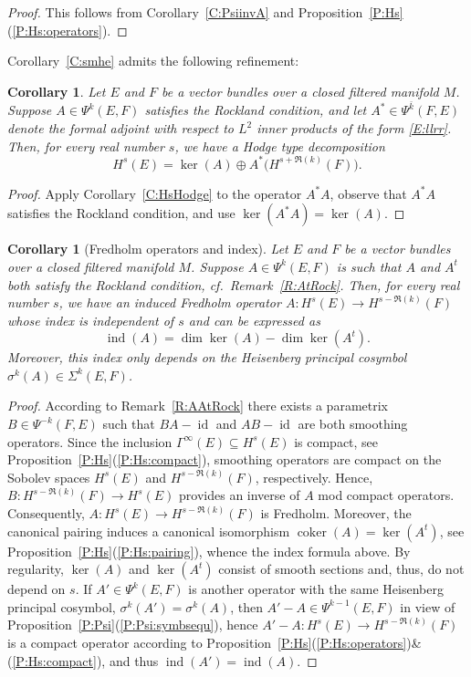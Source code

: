 \documentclass[reqno,12pt]{amsart}
\DeclareMathOperator{\coker}{coker}
\DeclareMathOperator{\ind}{ind}
\DeclareMathOperator{\id}{id}
\newcommand\itemref[1]{(\ref{#1})}
\theoremstyle{plain}
\newtheorem{corollary}[theorem]{Corollary}
\theoremstyle{definition}
\begin{document}
\begin{proof}
This follows from Corollary~\ref{C:PsiinvA} and Proposition~\ref{P:Hs}\itemref{P:Hs:operators}.
\end{proof}


Corollary~\ref{C:smhe} admits the following refinement:


\begin{corollary}\label{C:he}
Let $E$ and $F$ be a vector bundles over a closed filtered manifold $M$.
Suppose $A\in\Psi^k(E,F)$ satisfies the Rockland condition, and let $A^*\in\Psi^{\bar k}(F,E)$ denote the formal adjoint with respect to $L^2$ inner products of the form \eqref{E:llrr}.
Then, for every real number $s$, we have a Hodge type decomposition
$$
H^s(E)=\ker(A)\oplus A^*\bigl(H^{s+\Re(k)}(F)\bigr).
$$
\end{corollary}


\begin{proof}
Apply Corollary~\ref{C:HsHodge} to the operator $A^*A$, observe that $A^*A$ satisfies the Rockland condition, and use $\ker(A^*A)=\ker(A)$.
\end{proof}


\begin{corollary}[Fredholm operators and index]\label{C:Fredholm}
Let $E$ and $F$ be a vector bundles over a closed filtered manifold $M$.
Suppose $A\in\Psi^k(E,F)$ is such that $A$ and $A^t$ both satisfy the Rockland condition, cf.\ Remark~\ref{R:AtRock}.
Then, for every real number $s$, we have an induced Fredholm operator $A\colon H^s(E)\to H^{s-\Re(k)}(F)$ whose index is independent of $s$ and can be expressed as
$$
\ind(A)=\dim\ker(A)-\dim\ker(A^t).
$$
Moreover, this index only depends on the Heisenberg principal cosymbol $\sigma^k(A)\in\Sigma^k(E,F)$.
\end{corollary}


\begin{proof}
According to Remark~\ref{R:AAtRock} there exists a parametrix $B\in\Psi^{-k}(F,E)$ such that $BA-\id$ and $AB-\id$ are both smoothing operators.
Since the inclusion $\Gamma^\infty(E)\subseteq H^s(E)$ is compact, see Proposition~\ref{P:Hs}\itemref{P:Hs:compact}, smoothing operators are compact on the Sobolev spaces $H^s(E)$ and $H^{s-\Re(k)}(F)$, respectively.
Hence, $B\colon H^{s-\Re(k)}(F)\to H^s(E)$ provides an inverse of $A$ mod compact operators.
Consequently, $A\colon  H^s(E)\to H^{s-\Re(k)}(F)$ is Fredholm.
Moreover, the canonical pairing induces a canonical isomorphism $\coker(A)=\ker(A^t)$, see Proposition~\ref{P:Hs}\itemref{P:Hs:pairing}, whence the index formula above.
By regularity, $\ker(A)$ and $\ker(A^t)$ consist of smooth sections and, thus, do not depend on $s$.
If $A'\in\Psi^k(E,F)$ is another operator with the same Heisenberg principal cosymbol, $\sigma^k(A')=\sigma^k(A)$, then $A'-A\in\Psi^{k-1}(E,F)$ in view of Proposition~\ref{P:Psi}\itemref{P:Psi:symbsequ}, hence $A'-A\colon H^s(E)\to H^{s-\Re(k)}(F)$ is a compact operator according to Proposition~\ref{P:Hs}\itemref{P:Hs:operators}\&\itemref{P:Hs:compact}, and thus $\ind(A')=\ind(A)$.
\end{proof}
\end{document}
